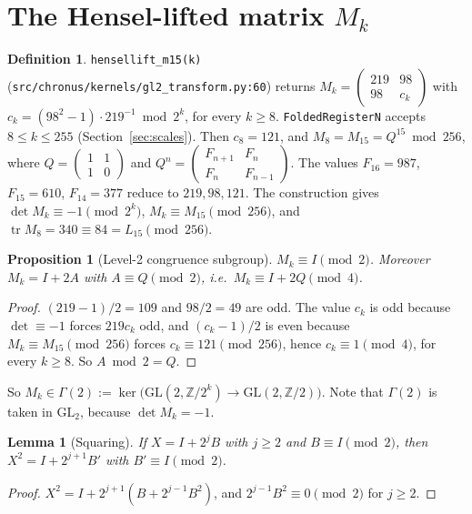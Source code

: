 \documentclass[11pt]{article}
\newtheorem{proposition}[theorem]{Proposition}
\newtheorem{lemma}[theorem]{Lemma}
\theoremstyle{definition}
\newtheorem{definition}[theorem]{Definition}
\newcommand{\Z}{\mathbb{Z}}
\newcommand{\GL}{\mathrm{GL}}
\newcommand{\tr}{\operatorname{tr}}
\newcommand{\code}[1]{\texttt{\small #1}}
\begin{document}
\section{The Hensel-lifted matrix $M_k$}\label{sec:mk}
\begin{definition}
\code{hensellift\_m15(k)} (\code{src/chronus/kernels/gl2\_transform.py:60}) returns
$M_k=\begin{pmatrix}219&98\\98&c_k\end{pmatrix}$ with $c_k=(98^2-1)\cdot219^{-1}\bmod 2^k$, for every $k\ge8$. \code{FoldedRegisterN} accepts $8\le k\le255$ (Section~\ref{sec:scales}).
Then $c_8=121$, and $M_8=M_{15}=Q^{15}\bmod 256$, where $Q=\begin{pmatrix}1&1\\1&0\end{pmatrix}$ and
$Q^n=\begin{pmatrix}F_{n+1}&F_n\\F_n&F_{n-1}\end{pmatrix}$. The values $F_{16}=987$, $F_{15}=610$, $F_{14}=377$ reduce
to $219,98,121$. The construction gives $\det M_k\equiv-1\pmod{2^k}$, $M_k\equiv M_{15}\pmod{256}$, and
$\tr M_8=340\equiv84=L_{15}\pmod{256}$.
\end{definition}

\begin{proposition}[Level-2 congruence subgroup]\label{prop:gamma2}
$M_k\equiv I\pmod 2$. Moreover $M_k=I+2A$ with $A\equiv Q\pmod 2$, i.e.\ $M_k\equiv I+2Q\pmod 4$.
\end{proposition}
\begin{proof}
$(219-1)/2=109$ and $98/2=49$ are odd. The value $c_k$ is odd because $\det\equiv-1$ forces $219c_k$ odd, and
$(c_k-1)/2$ is even because $M_k\equiv M_{15}\pmod{256}$ forces $c_k\equiv121\pmod{256}$, hence
$c_k\equiv1\pmod4$, for every $k\ge8$. So $A\bmod 2=Q$.
\end{proof}
So $M_k\in\Gamma(2):=\ker\bigl(\GL(2,\Z/2^k)\to\GL(2,\Z/2)\bigr)$. Note that $\Gamma(2)$ is taken in $\GL_2$,
because $\det M_k=-1$.

\begin{lemma}[Squaring]\label{lem:sq}
If $X=I+2^jB$ with $j\ge2$ and $B\equiv I\pmod 2$, then $X^2=I+2^{j+1}B'$ with $B'\equiv I\pmod 2$.
\end{lemma}
\begin{proof}
$X^2=I+2^{j+1}(B+2^{j-1}B^2)$, and $2^{j-1}B^2\equiv0\pmod 2$ for $j\ge2$.
\end{proof}
\end{document}
